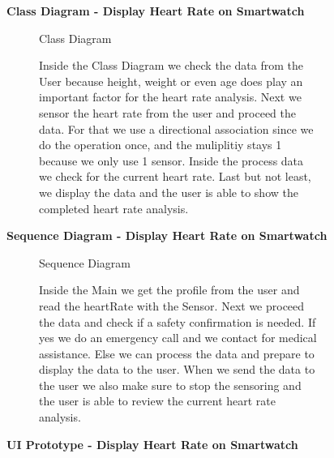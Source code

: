 \documentclass{article}
\begin{document}
	\clearpage
	\begin{figure}[htbp]
		\textbf{Class Diagram - Display Heart Rate on Smartwatch}
		\centering
		\begin{subfigure}{\textwidth}
			\resizebox{\textwidth}{!}{}
			\caption{Class Diagram}
		\end{subfigure}
		\begin{subfigure}{\textwidth}
			Inside the Class Diagram we check the data from the User because height, weight or even age does play an important factor
			for the heart rate analysis. Next we sensor the heart rate from the user and proceed the data. For that we use a directional 
			association since we do the operation once, and the muliplitiy stays 1 because we only use 1 sensor. Inside the process data we check for 
			the current heart rate. Last but not least, we display the data and the user is able to show the completed heart rate 
			analysis. 
		\end{subfigure}
	\end{figure}
	\clearpage

	\begin{figure}[htbp]
		\textbf{Sequence Diagram - Display Heart Rate on Smartwatch}
		\centering
		\begin{subfigure}{\textwidth}
			\resizebox{\textwidth}{!}{}
			\caption{Sequence Diagram}
		\end{subfigure}
		\begin{subfigure}{\textwidth}
			Inside the Main we get the profile from the user and read the heartRate with the Sensor. Next we proceed the data and check 
			if a safety confirmation is needed. If yes we do an emergency call and we contact for medical assistance. Else we can process 
			the data and prepare to display the data to the user. When we send the data to the user we also make sure to stop the sensoring and 
			the user is able to review the current heart rate analysis. 
		\end{subfigure}
	\end{figure}
	\clearpage
	\begin{figure}[htbp]
		\textbf{UI Prototype - Display Heart Rate on Smartwatch}
		\centering
		\begin{subfigure}{\textwidth}
			\resizebox{\textwidth}{!}{}
		\end{subfigure}
		\begin{subfigure}{\textwidth}
		
		\end{subfigure}
	\end{figure}
	\clearpage
\end{document}
